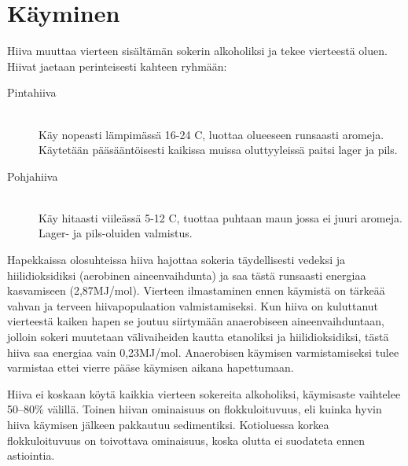 \documentclass[a4paper,11pt]{report}
\begin{document}
\section{Käyminen}

Hiiva muuttaa vierteen sisältämän sokerin alkoholiksi ja tekee vierteestä oluen. Hiivat jaetaan perinteisesti kahteen ryhmään:
\begin{description}
\item[Pintahiiva] \hfill \\
Käy nopeasti lämpimässä 16-24 \degree C, luottaa olueeseen runsaasti aromeja. Käytetään pääsääntöisesti kaikissa muissa oluttyyleissä paitsi lager ja pils.
\item[Pohjahiiva] \hfill \\
Käy hitaasti viileässä 5-12 \degree C, tuottaa puhtaan maun jossa ei juuri aromeja. Lager- ja pils-oluiden valmistus.
\end{description}

Hapekkaissa olosuhteissa hiiva hajottaa sokeria täydellisesti vedeksi ja hiilidioksidiksi (aerobinen aineenvaihdunta) ja saa tästä runsaasti energiaa kasvamiseen (2,87MJ/mol). Vierteen ilmastaminen ennen käymistä on tärkeää vahvan ja terveen hiivapopulaation valmistamiseksi. Kun hiiva on kuluttanut vierteestä kaiken hapen se joutuu siirtymään anaerobiseen aineenvaihduntaan, jolloin sokeri muutetaan välivaiheiden kautta etanoliksi ja hiilidioksidiksi, tästä hiiva saa energiaa vain 0,23MJ/mol. Anaerobisen käymisen varmistamiseksi tulee varmistaa ettei vierre pääse käymisen aikana hapettumaan.

Hiiva ei koskaan köytä kaikkia vierteen sokereita alkoholiksi, käymisaste vaihtelee 50--80\% välillä. Toinen hiivan ominaisuus on flokkuloituvuus, eli kuinka hyvin hiiva käymisen jälkeen pakkautuu sedimentiksi. Kotioluessa korkea flokkuloituvuus on toivottava ominaisuus, koska olutta ei suodateta ennen astiointia.
\end{document}
